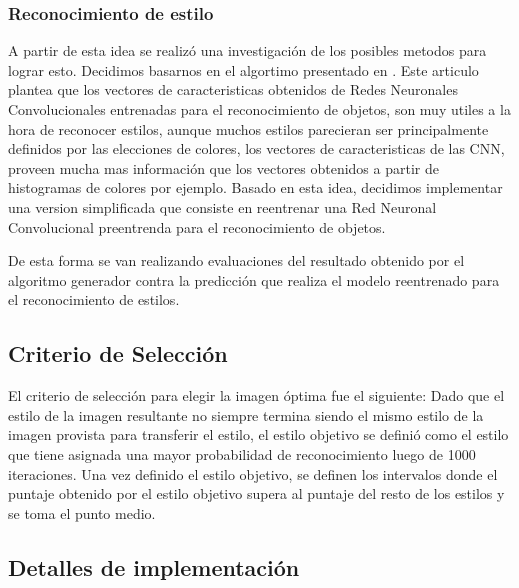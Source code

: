 \documentclass[a4paper,11pt,spanish]{book}
\begin{document}
      \subsubsection{Reconocimiento de estilo}
	A partir de esta idea se realizó una investigación de los posibles metodos para lograr esto. Decidimos basarnos en el algortimo presentado en \cite{Karayev:Style_Recognition}.
	Este articulo plantea que los vectores de caracteristicas obtenidos de Redes Neuronales Convolucionales entrenadas para el reconocimiento de objetos, son muy utiles a la hora de
	reconocer estilos, aunque muchos estilos parecieran ser principalmente definidos por las elecciones de colores, los vectores de caracteristicas de las CNN, proveen mucha mas información
	que los vectores obtenidos a partir de histogramas de colores por ejemplo.
	Basado en esta idea, decidimos implementar una version simplificada que consiste en reentrenar una Red Neuronal Convolucional preentrenda para el reconocimiento de objetos.

	De esta forma se van realizando evaluaciones del resultado obtenido por el algoritmo generador contra la predicción que realiza el modelo reentrenado para el reconocimiento de estilos.

    \subsection{Criterio de Selección}
      El criterio de selección para elegir la imagen óptima fue el siguiente:
      Dado que el estilo de la imagen resultante no siempre termina siendo el mismo estilo de la imagen provista para transferir el estilo, el estilo objetivo se definió como el estilo
      que tiene asignada una mayor probabilidad de reconocimiento luego de 1000 iteraciones.
      Una vez definido el estilo objetivo, se definen los intervalos donde el puntaje obtenido por el estilo objetivo supera al puntaje del resto de los estilos y se toma el punto medio.

    \subsection{Detalles de implementación}
\end{document}
